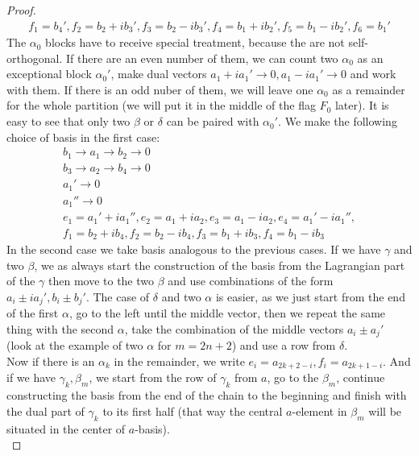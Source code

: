 \documentclass[12pt]{amsart}
\theoremstyle{definition}
\theoremstyle{remark}
\numberwithin{equation}{subsection}
\begin{document}
\begin{proof}
\begin{equation}
\begin{gathered}
    f_{1}=b_4',f_{2}=b_2+ib_3',f_{3}=b_2-ib_3',f_{4}=b_1+ib_2',f_{5}=b_1-ib_2',f_{6}=b_1'
\end{gathered}
\end{equation}
The $\alpha_0$ blocks have to receive special treatment, because the are not self-orthogonal. If there are an even number of them, we can count two $\alpha_0$ as an exceptional block $\alpha_0'$,  make dual vectors $a_1+ia_1' \rightarrow 0,a_1-ia_1' \rightarrow 0$ and work with them. If there is an odd nuber of them, we will leave one $\alpha_0$ as a remainder for the whole partition (we will put it in the middle of the flag $F_0$ later). It is easy to see that only two $\beta$ or $\delta$ can be paired with $\alpha_0'$. We make the following choice of basis in the first case:
\begin{equation}
\begin{gathered}
    b_1 \rightarrow a_1 \rightarrow b_2 \rightarrow 0\\
    b_3 \rightarrow a_2 \rightarrow b_4 \rightarrow 0\\
    a_1' \rightarrow  0\\
    a_1'' \rightarrow 0\\
    e_{1}=a_1'+ia_1'',e_{2}=a_1+ia_2,e_{3}=a_1-ia_2,e_{4}=a_1'-ia_1'',\\
    f_{1}=b_2+ib_4,f_{2}=b_2-ib_4,f_{3}=b_1+ib_3,f_{4}=b_1-ib_3
\end{gathered}
\end{equation}
In the second case we take basis analogous to the previous cases. If we have $\gamma$ and two $\beta$, we as always start the construction of the basis from the Lagrangian part of the $\gamma$ then move to the two $\beta$ and use combinations of the form $a_i\pm ia_j',b_i\pm b_j'$. The case of $\delta$ and two $\alpha$ is easier, as we just start from the end of the first $\alpha$, go to the left until the middle vector, then we repeat the same thing with the second $\alpha$, take the combination of the middle vectors $a_i \pm a_j'$ (look at the example of two $\alpha$ for $m=2n+2$) and use a row from $\delta$.\\
Now if there is an $\alpha_k$ in the remainder, we write $e_{i}=a_{2k+2-i},f_{i}=a_{2k+1-i}$. And if we have $\gamma_k, \beta_m$, we start from the row of $\gamma_k$ from $a$, go to the $\beta_m$, continue constructing the basis from the end of the chain to the beginning and finish with the dual part of $\gamma_k$ to its first half (that way the central $a$-element in $\beta_m$ will be situated in the center of $a$-basis).\\

\end{proof}
\end{document}
